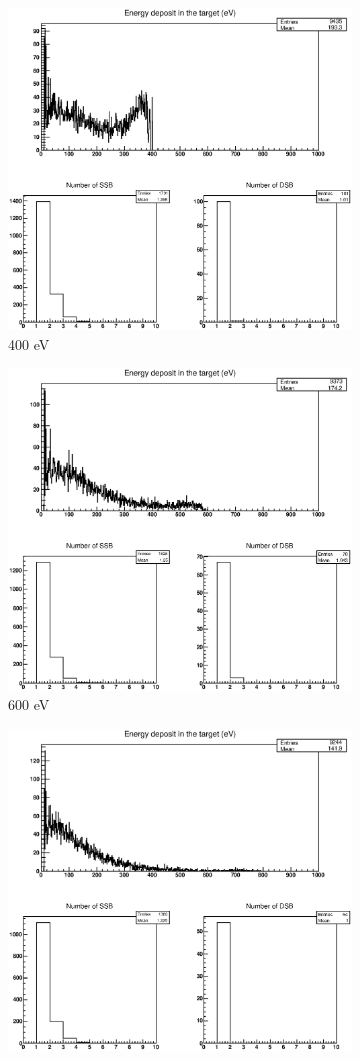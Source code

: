 \begin{figure}
\begin{subfigure}{.5\textwidth}
  \includegraphics[width=.78\linewidth]{./Figures/e-400ev.eps}
  \caption{400 eV}
  \label{fig:subei3}
\end{subfigure}%
\begin{subfigure}{.5\textwidth}
  \centering
  \includegraphics[width=.78\linewidth]{./Figures/e-600.eps}
  \caption{600 eV}
  \label{fig:subei4}
\end{subfigure}
\begin{subfigure}{.5\textwidth}
  \centering
  \includegraphics[width=.78\linewidth]{./Figures/e-800ev.eps}

\end{subfigure}
\end{figure}
